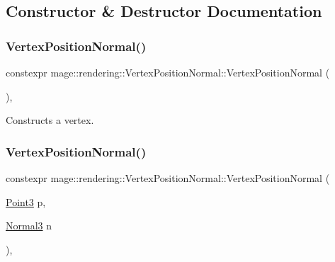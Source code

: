 \subsection{Constructor \& Destructor Documentation}
\hypertarget{structmage_1_1rendering_1_1_vertex_position_normal_afa00dc1c7ed3f8c09dc68ee6e7d1c43f}{}\label{structmage_1_1rendering_1_1_vertex_position_normal_afa00dc1c7ed3f8c09dc68ee6e7d1c43f} 
\subsubsection{\texorpdfstring{Vertex\+Position\+Normal()}{VertexPositionNormal()}\hspace{0.1cm}{\footnotesize\ttfamily [1/4]}}
{\footnotesize\ttfamily constexpr mage\+::rendering\+::\+Vertex\+Position\+Normal\+::\+Vertex\+Position\+Normal (\begin{DoxyParamCaption}{ }\end{DoxyParamCaption})\hspace{0.3cm}{\ttfamily [default]}, {\ttfamily [noexcept]}}

Constructs a vertex. \hypertarget{structmage_1_1rendering_1_1_vertex_position_normal_a587edfdfb7feecc7b9d9dfea6c2fe632}{}\label{structmage_1_1rendering_1_1_vertex_position_normal_a587edfdfb7feecc7b9d9dfea6c2fe632} 
\subsubsection{\texorpdfstring{Vertex\+Position\+Normal()}{VertexPositionNormal()}\hspace{0.1cm}{\footnotesize\ttfamily [2/4]}}
{\footnotesize\ttfamily constexpr mage\+::rendering\+::\+Vertex\+Position\+Normal\+::\+Vertex\+Position\+Normal (\begin{DoxyParamCaption}\item[{\hyperlink{structmage_1_1_point3}{Point3}}]{p,  }\item[{\hyperlink{structmage_1_1_normal3}{Normal3}}]{n }\end{DoxyParamCaption})\hspace{0.3cm}{\ttfamily [explicit]}, {\ttfamily [noexcept]}}

